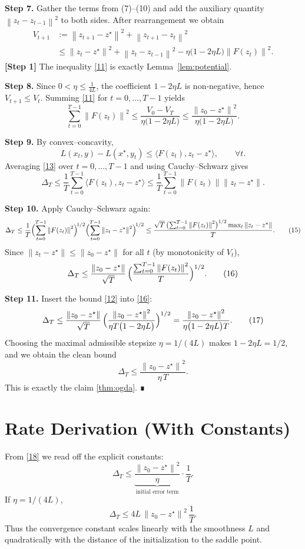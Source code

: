 \documentclass{article}
\newcommand{\norm}[1]{\left\lVert#1\right\rVert}
\newcommand{\inner}[2]{\langle #1,#2\rangle}
\begin{document}
\noindent\textbf{Step 7.}  Gather the terms from (7)–(10) and add the auxiliary
quantity $\norm{z_t-z_{t-1}}^{2}$ to both sides. After rearrangement we obtain
\[
\begin{aligned}
V_{t+1}
&:=\norm{z_{t+1}-z^\star}^{2}+\norm{z_{t+1}-z_t}^{2}\\
&\le \norm{z_t-z^\star}^{2}+\norm{z_t-z_{t-1}}^{2}
-\eta\bigl(1-2\eta L\bigr)\norm{F(z_t)}^{2}.
\end{aligned}
\tag{11}
\]
\noindent\textbf{[Step 1]} The inequality \eqref{11} is exactly Lemma~\ref{lem:potential}.

\noindent\textbf{Step 8.}  Since $0<\eta\le\frac{1}{4L}$, the coefficient
$1-2\eta L$ is non‑negative, hence $V_{t+1}\le V_t$. Summing \eqref{11} for
$t=0,\dots,T-1$ yields
\[
\sum_{t=0}^{T-1}\norm{F(z_t)}^{2}
\le \frac{V_0-V_T}{\eta\bigl(1-2\eta L\bigr)}
\le \frac{\norm{z_0-z^\star}^{2}}{\eta\bigl(1-2\eta L\bigr)}.
\tag{12}
\]

\noindent\textbf{Step 9.}  By convex–concavity,
\[
L(x_t,y)-L(x^\star,y_t)\le\inner{F(z_t)}{z_t-z^\star},
\qquad
\forall t.
\tag{13}
\]
Averaging \eqref{13} over $t=0,\dots,T-1$ and using Cauchy–Schwarz gives
\[
\Delta_T
\le \frac{1}{T}\sum_{t=0}^{T-1}\inner{F(z_t)}{z_t-z^\star}
\le \frac{1}{T}\sum_{t=0}^{T-1}\norm{F(z_t)}\norm{z_t-z^\star}.
\tag{14}
\]

\noindent\textbf{Step 10.}  Apply Cauchy–Schwarz again:
\[
\Delta_T\le
\frac{1}{T}\Bigl(\sum_{t=0}^{T-1}\norm{F(z_t)}^{2}\Bigr)^{\!1/2}
\Bigl(\sum_{t=0}^{T-1}\norm{z_t-z^\star}^{2}\Bigr)^{\!1/2}
\le\frac{\sqrt{T}\,\bigl(\sum_{t=0}^{T-1}\norm{F(z_t)}^{2}\bigr)^{1/2}
\max_{t}\norm{z_t-z^\star}}{T}.
\tag{15}
\]
Since $\norm{z_t-z^\star}\le \norm{z_0-z^\star}$ for all $t$ (by monotonicity of $V_t$),
\[
\Delta_T\le\frac{\norm{z_0-z^\star}}{\sqrt{T}}\,
\Bigl(\frac{\sum_{t=0}^{T-1}\norm{F(z_t)}^{2}}{T}\Bigr)^{1/2}.
\tag{16}
\]

\noindent\textbf{Step 11.}  Insert the bound \eqref{12} into \eqref{16}:
\[
\Delta_T\le
\frac{\norm{z_0-z^\star}}{\sqrt{T}}\,
\Bigl(\frac{\norm{z_0-z^\star}^{2}}{\eta T\bigl(1-2\eta L\bigr)}\Bigr)^{1/2}
=\frac{\norm{z_0-z^\star}^{2}}{\eta\bigl(1-2\eta L\bigr)T}.
\tag{17}
\]
Choosing the maximal admissible stepsize $\eta=1/(4L)$ makes
$1-2\eta L=1/2$, and we obtain the clean bound
\[
\boxed{\displaystyle
\Delta_T\le\frac{\norm{z_0-z^\star}^{2}}{\eta\,T}}.
\tag{18}
\]
This is exactly the claim \eqref{thm:ogda}. ∎

\section*{Rate Derivation (With Constants)}
From \eqref{18} we read off the explicit constants:
\[
\Delta_T\le \underbrace{\frac{\norm{z_0-z^\star}^{2}}{\eta}}_{\text{initial error term}}
\cdot\frac{1}{T}.
\]
If $\eta=1/(4L)$,
\[
\Delta_T\le 4L\,\norm{z_0-z^\star}^{2}\,\frac{1}{T}.
\]
Thus the convergence constant scales linearly with the smoothness $L$ and
quadratically with the distance of the initialization to the saddle point.
\end{document}
